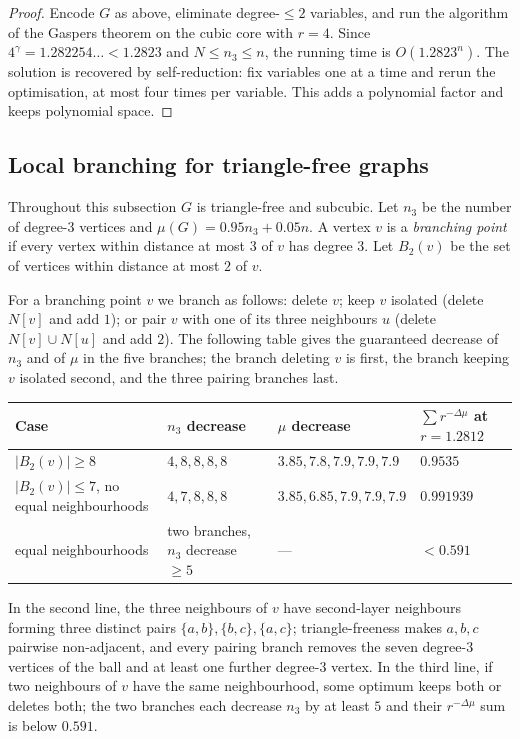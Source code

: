 \documentclass[11pt]{article}
\begin{document}
\begin{proof}
Encode \(G\) as above, eliminate degree-\(\le2\) variables, and run the algorithm of
the Gaspers theorem on the cubic core with \(r=4\). Since
\(4^\gamma=1.282254\ldots<1.2823\) and \(N\le n_3\le n\), the running time is
\(O(1.2823^n)\). The solution is recovered by self-reduction: fix variables one at a
time and rerun the optimisation, at most four times per variable. This adds a
polynomial factor and keeps polynomial space.
\end{proof}

\subsection*{Local branching for triangle-free graphs}

Throughout this subsection \(G\) is triangle-free and subcubic. Let \(n_3\) be the
number of degree-\(3\) vertices and \(\mu(G)=0.95n_3+0.05n\). A vertex \(v\) is a
\emph{branching point} if every vertex within distance at most \(3\) of \(v\) has
degree \(3\). Let \(B_2(v)\) be the set of vertices within distance at most \(2\) of
\(v\).

For a branching point \(v\) we branch as follows: delete \(v\); keep \(v\) isolated
(delete \(N[v]\) and add \(1\)); or pair \(v\) with one of its three neighbours \(u\)
(delete \(N[v]\cup N[u]\) and add \(2\)). The following table gives the guaranteed
decrease of \(n_3\) and of \(\mu\) in the five branches; the branch deleting \(v\) is
first, the branch keeping \(v\) isolated second, and the three pairing branches last.

\begin{center}
\small
\begin{tabular}{llll}
\hline
Case & \(n_3\) decrease & \(\mu\) decrease & \(\sum r^{-\Delta\mu}\) at \(r=1.2812\) \\
\hline
\(|B_2(v)|\ge8\) & \(4,8,8,8,8\) & \(3.85,7.8,7.9,7.9,7.9\) & \(0.9535\) \\
\(|B_2(v)|\le7\), no equal neighbourhoods & \(4,7,8,8,8\) & \(3.85,6.85,7.9,7.9,7.9\) & \(0.991939\) \\
equal neighbourhoods & two branches, \(n_3\) decrease \(\ge5\) & --- & \(<0.591\) \\
\hline
\end{tabular}
\end{center}

In the second line, the three neighbours of \(v\) have second-layer neighbours
forming three distinct pairs \(\{a,b\},\{b,c\},\{a,c\}\); triangle-freeness makes
\(a,b,c\) pairwise non-adjacent, and every pairing branch removes the seven
degree-\(3\) vertices of the ball and at least one further degree-\(3\) vertex. In the
third line, if two neighbours of \(v\) have the same neighbourhood, some optimum
keeps both or deletes both; the two branches each decrease \(n_3\) by at least \(5\)
and their \(r^{-\Delta\mu}\) sum is below \(0.591\).
\end{document}
